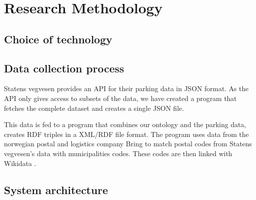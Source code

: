 \chapter{Research Methodology}

\section{Choice of technology}



\section{Data collection process}
Statens vegvesen \cite{statensvegvesen} provides an API for their parking data in JSON format. As the API only gives access to subsets of the data, we have created a program that fetches the complete dataset and creates a single JSON file.

This data is fed to a program that combines our ontology and the parking data, creates RDF triples in a XML/RDF file format. The program uses data from the norwegian postal and logistics company Bring \cite{bring} to match postal codes from Statens vegvesen's data with municipalities codes. These codes are then linked with Wikidata \cite{wikidata}.


\section{System architecture}



